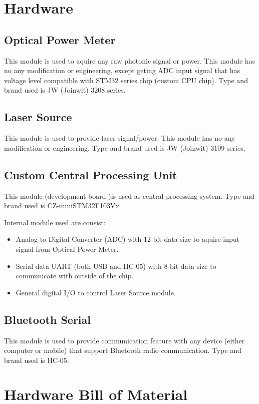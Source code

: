 \documentclass[12pt,]{book}
\begin{document}
	\section{Hardware}
	
	\subsection{Optical Power Meter}
	This module is used to aquire any raw photonic signal or power.
	This module has no any modification or engineering, except geting ADC input signal that has voltage level compatible with STM32 series chip (custom CPU chip).
	Type and brand used is JW (Joinwit) 3208 series.
	
	\subsection{Laser Source}
	This module is used to provide laser signal/power. 
	This module has no any modification or engineering.
	Type and brand used is JW (Joinwit) 3109 series.
	
	\subsection{Custom Central Processing Unit}
	This module (development board )is used as central processing system.
	Type and brand used is CZ-miniSTM32F103Vx.
	
	Internal module used are consist:
	\begin{itemize}
		\item Analog to Digital Converter (ADC) with 12-bit data size to aquire input signal from Optical Power Meter.
		\item Serial data UART (both USB and HC-05) with 8-bit data size to communicate with outside of the chip.
		\item General digital I/O to control Laser Source module.
	\end{itemize}

	\subsection{Bluetooth Serial}
	This module is used to provide communication feature with any device (either computer or mobile) that support Bluetooth radio communication. 
	Type and brand used is HC-05.
	
	\section{Hardware Bill of Material}
	
\end{document}
